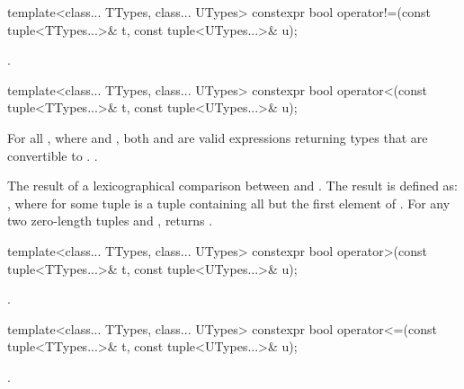 %
\begin{itemdecl}
template<class... TTypes, class... UTypes>
  constexpr bool operator!=(const tuple<TTypes...>& t, const tuple<UTypes...>& u);
\end{itemdecl}
\begin{itemdescr}
\pnum\returns {}.
\end{itemdescr}

%
\begin{itemdecl}
template<class... TTypes, class... UTypes>
  constexpr bool operator<(const tuple<TTypes...>& t, const tuple<UTypes...>& u);
\end{itemdecl}

\begin{itemdescr}
\pnum
\requires  For all ,
where  and
, both 
and 
are valid expressions returning types that are
convertible to .
 \tcode{==}
.

\pnum\returns  The result of a lexicographical comparison
between  and . The result is defined
as: , where  for some
tuple  is a tuple containing all but the first element
of .  For any two zero-length tuples 
and ,  returns .
\end{itemdescr}

%
\begin{itemdecl}
template<class... TTypes, class... UTypes>
  constexpr bool operator>(const tuple<TTypes...>& t, const tuple<UTypes...>& u);
\end{itemdecl}
\begin{itemdescr}
\pnum\returns {}.
\end{itemdescr}

%
\begin{itemdecl}
template<class... TTypes, class... UTypes>
  constexpr bool operator<=(const tuple<TTypes...>& t, const tuple<UTypes...>& u);
\end{itemdecl}
\begin{itemdescr}
\pnum\returns {}.
\end{itemdescr}


